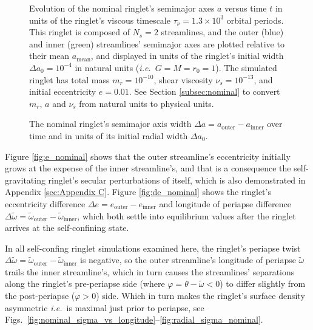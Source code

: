 \documentclass[preprint]{aastex62}
\begin{document}
\begin{figure}
\caption{
\label{fig:a_nominal}
Evolution of the nominal ringlet's semimajor axes $a$
versus time $t$ in units of the ringlet's viscous timescale
$\tau_\nu=1.3\times10^3$ orbital periods. This ringlet is composed of $N_s=2$ streamlines,
and the outer (blue) and inner (green) streamlines' semimajor axes are plotted relative
to their mean $a_{\text{mean}}$, and displayed in units of the ringlet's
initial width $\Delta a_0 = 10^{-4}$ in natural units ({\it i.e.}\ $G=M=r_0=1$).
The simulated ringlet has total mass $m_r=10^{-10}$, shear viscosity $\nu_s=10^{-13}$,
and initial eccentricity $e=0.01$. See Section \ref{subsec:nominal} to convert
$m_r$, $a$ and $\nu_s$ from natural units to physical units.}
\end{figure}

\begin{figure}
\caption{
\label{fig:da_nominal}
The nominal ringlet's semimajor axis width $\Delta a = a_{\text{outer}} - a_{\text{inner}}$ over time
and in units of its initial radial width $\Delta a_0$.}
\end{figure}

Figure \ref{fig:e_nominal} shows that the outer streamline's eccentricity initially grows at the
expense of the inner streamline's, and that is a consequence the self-gravitating ringlet's
secular perturbations of itself, which is also demonstrated in Appendix \ref{sec:Appendix C}. 
Figure \ref{fig:de_nominal} shows
the ringlet's eccentricity difference $\Delta e = e_{\text{outer}} - e_{\text{inner}}$
and longitude of periapse difference
$\Delta\tilde{\omega} = \tilde{\omega}_{\text{outer}} - \tilde{\omega}_{\text{inner}}$,
which both settle into equilibrium values after the ringlet arrives at the self-confining
state. 

In all self-confing ringlet simulations examined here, the ringlet's periapse twist 
$\Delta\tilde{\omega} = \tilde{\omega}_{\text{outer}} - \tilde{\omega}_{\text{inner}}$ is negative,
so the outer streamline's longitude of periapse $\tilde{\omega}$ trails
the inner streamline's, which in turn causes the streamlines' separations along
the ringlet's pre-periapse side (where $\varphi = \theta - \tilde{\omega} < 0$) 
to differ slightly from the post-periapse ($\varphi>0$) side.
Which in turn makes the ringlet's surface density asymmetric {\it i.e.}\ is
maximal just prior to periapse, see
Figs.\ \ref{fig:nominal_sigma_vs_longitude}--\ref{fig:radial_sigma_nominal}.
\end{document}
